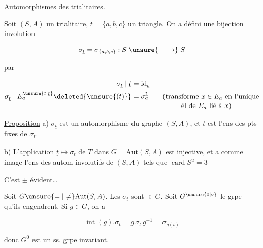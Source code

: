 \uline{Automorphismes des   trialitaires}.

Soit $(S,A)$ un   trialitaire, $\underline t=\{a,b,c\}$ un triangle. On a défini une bijection involution 

\[ \sigma_{\underline t}=\sigma_{\{a,b,c\}}: S\mathrel{\unsure{-|\to}}S \]

par

\[
\begin{aligned}
\sigma_{\underline t}\mid\underline t&=\mathrm{id}_{\underline t}\\
\sigma_{\underline t}\mid E_a^{\unsure{t|\underline t}}\deleted{\unsure{(t)}}&=\sigma_a^{\underline t}
\qquad\text{(transforme $x\in E_a$ en l'unique}\\[-2pt]
&\hspace{7em}\text{él de $E_a$ lié à $x$)}
\end{aligned}
\]

\uline{Proposition} \qquad a) $\sigma_{\underline t}$ est un automorphisme du  graphe $(S,A)$, et $\underline t$ est l'ens des pts fixes de $\sigma_{\underline t}$.

b) L'application $\underline t\longmapsto\sigma_{\underline t}$ de $T$ dans $G=\mathrm{Aut}(S,A)$ est injective, et a comme image l'ens des autom involutifs  de $(S,A)$ tels que  $\operatorname{card} S^u=3$

C'est $\pm$ évident\ldots

Soit $G\unsure{=|\neq}\mathrm{Aut}(S,A)$. Les $\sigma_t$ sont $\in G$. Soit $G^{\unsure{0|\circ}}$ le grpe qu'ils engendrent. Si $g\in G$, on a

\[ \operatorname{int}(g).\sigma_t=g\,\sigma_t\,g^{-1}=\sigma_{g(t)} \]

donc $G^0$ est un ss. grpe invariant.


